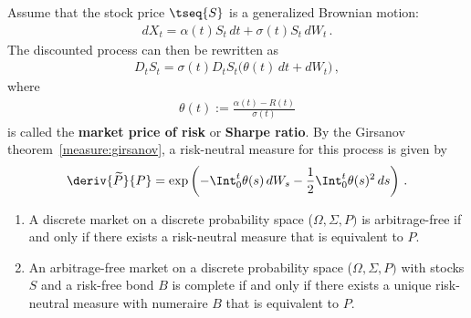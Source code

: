     \begin{example}
        Assume that the stock price $\tseq{S}$ is a generalized Brownian motion:
        \begin{gather}
            dX_t = \alpha(t)S_t\,dt + \sigma(t)S_t\,dW_t\,.
        \end{gather}
        The discounted process can then be rewritten as
        \begin{gather}
            D_tS_t = \sigma(t)D_tS_t\bigl(\theta(t)\,dt + dW_t\bigr)\,,
        \end{gather}
        where
        \begin{gather}
            \theta(t) := \frac{\alpha(t) - R(t)}{\sigma(t)}
        \end{gather}
        is called the \textbf{market price of risk} or \textbf{Sharpe ratio}. By the Girsanov theorem~\ref{measure:girsanov}, a risk-neutral measure for this process is given by
        \begin{gather}
            \deriv{\widetilde{P}}{P} = \exp\left(-\Int_0^t\theta(s)\,dW_s - \frac{1}{2}\Int_0^t\theta(s)^2\,ds\right)\,.
        \end{gather}
    \end{example}

    \begin{theorem}
        \begin{enumerate}
            \item A discrete market on a discrete probability space ($\Omega,\Sigma,P)$ is arbitrage-free if and only if there exists a risk-neutral measure that is equivalent to $P$.
            \item An arbitrage-free market on a discrete probability space ($\Omega,\Sigma,P)$ with stocks $S$ and a risk-free bond $B$ is complete if and only if there exists a unique risk-neutral measure with numeraire $B$ that is equivalent to $P$.
        \end{enumerate}
    \end{theorem}

    \begin{theorem}
        
    \end{theorem}
